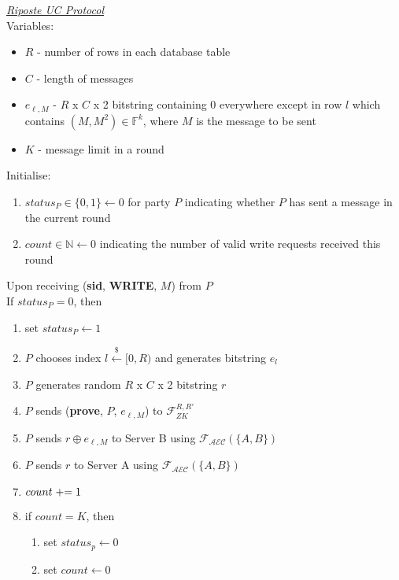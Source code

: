 



\begin{tcolorbox}[colback=white, arc=5pt]
\noindent\emph{\underline{Riposte UC Protocol}}\\[5pt]
Variables:
\begin{itemize}
    \item $R$ - number of rows in each database table
    \item $C$ - length of messages
    \item $e_{\ell,M}$ - $R$ x $C$ x 2 bitstring containing 0 everywhere except in row $l$ which contains $(M, M^2)\in \mathbb{F}^k$, where $M$ is the message to be sent
    \item $K$ - message limit in a round
\end{itemize}
Initialise:
\begin{enumerate}
    \item $status_P\in\{0,1\}\leftarrow 0$ for party $P$ indicating whether $P$ has sent a message in the current round
    \item $count\in\mathbb{N}\leftarrow 0$ indicating the number of valid write requests received this round
\end{enumerate}
\extitem Upon receiving (\textbf{sid}, \textbf{WRITE}, $M$) from $P$\\
If $status_P=0$, then
\begin{enumerate}
    \item set $status_P\leftarrow 1$
    \item $P$ chooses index $l \overset{{\scriptscriptstyle\$}}{\leftarrow} [0,R)$ and generates bitstring $e_l$
    \item $P$ generates random $R$ x $C$ x 2 bitstring $r$
    \item $P$ sends (\textbf{prove}, $P$, $e_{\ell,M}$) to $\mathcal{F}_{ZK}^{R,R'}$
    \item $P$ sends $r\oplus e_{\ell,M}$ to Server B using $\mathcal{F}_{\mathcal{AEC}}(\{A,B\})$
    \item $P$ sends $r$ to Server A using $\mathcal{F}_{\mathcal{AEC}}(\{A,B\})$
    
    \item $count \mathrel{+}= 1$
    \item if $count=K$, then
    \begin{enumerate}
        \item set $status_p\leftarrow0$
        \item set $count \leftarrow 0$
    \end{enumerate}
\end{enumerate}


\end{tcolorbox}
